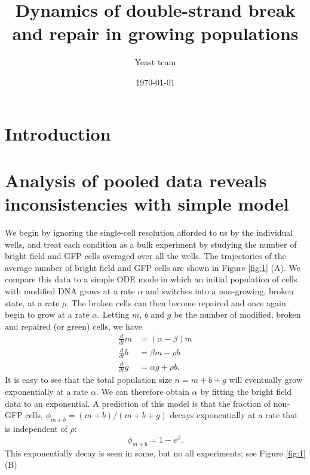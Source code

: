\documentclass{article}
\author[1]{Yeast team}
\affil[1]{Harvard, Pasteur, Peking }
\title{Dynamics of double-strand break and repair in growing populations}
\date{\today}
\makeatletter
\renewcommand{\maketitle}{\bgroup\setlength{\parindent}{0pt}
\begin{flushleft}
  \textbf{\LARGE \@title}

  \@author
\end{flushleft}\egroup
}
\makeatother
\begin{document}
\maketitle
\tableofcontents

\section{Introduction}

\section{Analysis of pooled data reveals inconsistencies with simple model}
We begin by ignoring the single-cell resolution afforded to us by the individual wells, and treat each condition as a bulk experiment by studying the number of bright field and GFP cells averaged over all the wells. The trajectories of the average number of bright field and GFP cells are shown in Figure \ref{fig:1} (A). We compare this data to a simple ODE mode in which an initial population of cells with modified DNA grows at a rate $\alpha$ and switches into a non-growing, broken state, at a rate $\rho$. The broken cells can then become repaired and once again begin to grow at a rate $\alpha$. Letting $m$, $b$ and $g$ be the number of modified, broken and repaired (or green) cells, we have
\begin{align}\label{mbg_ode}
\frac{d}{dt}m &= (\alpha - \beta) m\\
\frac{d}{dt}b &= \beta m - \rho b\\
\frac{d}{dt}g &= \alpha g + \rho b.
\end{align}
It is easy to see that the total population size $n = m+b+g$ will eventually grow exponentially at a rate $\alpha$. We can therefore obtain $\alpha$ by fitting the bright field data to an exponential. 
A prediction of this model is that the fraction of  non-GFP cells, $\phi_{m+b} = (m+b)/(m+b+g)$  decays exponentially at a rate that is independent of $\rho$: 
\begin{equation}
\phi_{m+b}= 1- e^{\beta}. 
\end{equation}
This exponentially decay is seen in some, but no all experiments; see Figure \ref{fig:1} (B)
\end{document}
